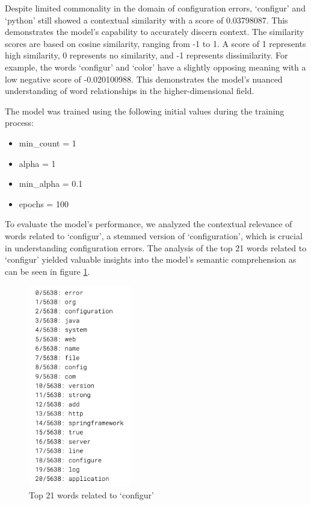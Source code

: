 \documentclass[english,bachelor]{swsLeipzig}
\begin{document}
Despite limited commonality in the domain of configuration errors, `configur' and `python' still showed a contextual similarity with a score of 0.03798087. This demonstrates the model's capability to accurately discern context. The similarity scores are based on cosine similarity, ranging from -1 to 1. A score of 1 represents high similarity, 0 represents no similarity, and -1 represents dissimilarity. For example, the words `configur' and `color' have a slightly opposing meaning with a low negative score of -0.020100988. This demonstrates the model's nuanced understanding of word relationships in the higher-dimensional field.

\newpage

The model was trained using the following initial values during the training process:

\begin{itemize}
  \item min\_count = 1
  \item alpha = 1
  \item min\_alpha = 0.1
  \item epochs = 100
\end{itemize}

To evaluate the model's performance, we analyzed the contextual relevance of words related to 
`configur', a stemmed version of `configuration', which is crucial in understanding configuration errors. The analysis of the top 21 words related to `configur' yielded valuable insights into the model's semantic comprehension as can be seen in figure \ref{fig:figure52}.

\begin{figure}[h]
  \centering
  \includegraphics[width=0.4\textwidth]{images/ressimilar.png}
  \caption{Top 21 words related to `configur'}
  \label{fig:figure52}
\end{figure}
\end{document}
